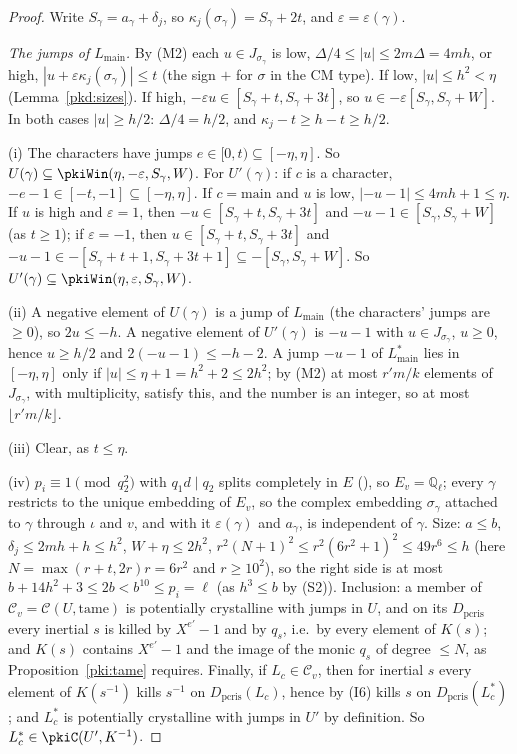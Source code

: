 \documentclass[10pt]{amsart}
\theoremstyle{definition}
\theoremstyle{remark}
\newcommand{\Q}{\mathbb Q}
\begin{document}
\begin{proof}
Write $S_\gamma=a_\gamma+\delta_j$, so $\kappa_j(\sigma_\gamma)=S_\gamma+2t$, and $\varepsilon=\varepsilon(\gamma)$.

\emph{The jumps of $L_{\mathrm{main}}$.} By (M2) each $u\in J_{\sigma_\gamma}$ is low,
$\Delta/4\le|u|\le2m\Delta=4mh$, or high, $|u+\varepsilon\kappa_j(\sigma_\gamma)|\le t$ (the sign $+$
for $\sigma$ in the CM type). If low, $|u|\le h^2<\eta$ (Lemma~\ref{pkd:sizes}). If high,
$-\varepsilon u\in[S_\gamma+t,S_\gamma+3t]$, so $u\in-\varepsilon[S_\gamma,S_\gamma+W]$. In both cases
$|u|\ge h/2$: $\Delta/4=h/2$, and $\kappa_j-t\ge h-t\ge h/2$.

(i) The characters have jumps $e\in[0,t)\subseteq[-\eta,\eta]$. So
$U(\gamma)\subseteq\pkiWin(\eta,-\varepsilon,S_\gamma,W)$. For $U'(\gamma)$: if $c$ is a character,
$-e-1\in[-t,-1]\subseteq[-\eta,\eta]$. If $c=\mathrm{main}$ and $u$ is low, $|-u-1|\le4mh+1\le\eta$. If
$u$ is high and $\varepsilon=1$, then $-u\in[S_\gamma+t,S_\gamma+3t]$ and $-u-1\in[S_\gamma,S_\gamma+W]$
(as $t\ge1$); if $\varepsilon=-1$, then $u\in[S_\gamma+t,S_\gamma+3t]$ and
$-u-1\in-[S_\gamma+t+1,S_\gamma+3t+1]\subseteq-[S_\gamma,S_\gamma+W]$. So
$U'(\gamma)\subseteq\pkiWin(\eta,\varepsilon,S_\gamma,W)$.

(ii) A negative element of $U(\gamma)$ is a jump of $L_{\mathrm{main}}$ (the characters' jumps are
$\ge0$), so $2u\le-h$. A negative element of $U'(\gamma)$ is $-u-1$ with $u\in J_{\sigma_\gamma}$,
$u\ge0$, hence $u\ge h/2$ and $2(-u-1)\le-h-2$. A jump $-u-1$ of $L_{\mathrm{main}}^*$ lies in
$[-\eta,\eta]$ only if $|u|\le\eta+1=h^2+2\le2h^2$; by (M2) at most $r'm/k$ elements of
$J_{\sigma_\gamma}$, with multiplicity, satisfy this, and the number is an integer, so at most
$\lfloor r'm/k\rfloor$.

(iii) Clear, as $t\le\eta$.

(iv) $p_i\equiv1\pmod{q_2^2}$ with $q_1d\mid q_2$ splits completely in $E$ ({\cite[\S2]{P55}}), so
$E_v=\Q_\ell$; every $\gamma$ restricts to the unique embedding of $E_v$, so the complex embedding
$\sigma_\gamma$ attached to $\gamma$ through $\iota$ and $v$, and with it $\varepsilon(\gamma)$ and
$a_\gamma$, is independent of $\gamma$. Size: $a\le b$, $\delta_j\le2mh+h\le h^2$, $W+\eta\le2h^2$,
$r^2(N+1)^2\le r^2(6r^2+1)^2\le49r^6\le h$ (here $N=\max(r+t,2r)r=6r^2$ and $r\ge10^2$), so the right side is at most $b+14h^2+3\le2b<b^{10}\le p_i=\ell$
(as $h^3\le b$ by (S2)). Inclusion: a member of $\mathcal C_v=\mathcal C(U,\mathrm{tame})$ is potentially
crystalline with jumps in $U$, and on its $D_{\mathrm{pcris}}$ every inertial $s$ is killed by
$X^{e'}-1$ and by $q_s$, i.e.\ by every element of $K(s)$; and $K(s)$ contains $X^{e'}-1$ and the
image of the monic $q_s$ of degree $\le N$, as Proposition~\ref{pki:tame} requires. Finally, if
$L_c\in\mathcal C_v$, then for inertial $s$ every element of $K(s^{-1})$ kills $s^{-1}$ on
$D_{\mathrm{pcris}}(L_c)$, hence by (I6) kills $s$ on $D_{\mathrm{pcris}}(L_c^*)$; and $L_c^*$ is
potentially crystalline with jumps in $U'$ by definition. So $L_c^*\in\pkiC(U',K^{-1})$.
\end{proof}
\end{document}
